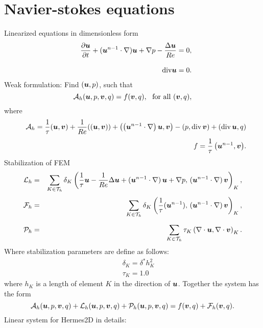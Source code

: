 \documentclass[a4paper,12pt]{article}
\newcommand{\bfu}{\mbox{\boldmath $u$}}
\newcommand{\bfv}{\mbox{\boldmath $v$}}
\begin{document}
\section{Navier-stokes equations}

Linearized equations in dimensionless form
\begin{eqnarray}
&& \displaystyle{\frac{\partial \bfu}{\partial t} + (\bfu^{n-1} \cdot \nabla)\bfu + \nabla p - \frac{\Delta \bfu}{Re} = 0,}\\[3mm]
&& \displaystyle{\mbox{div} \bfu = 0.}
\end{eqnarray}
Weak formulation: Find $(\bfu, p)$, such that
\begin{equation}
 {\cal A}_h(\bfu, p, \bfv, q) = f(\bfv, q),\ \ \mbox{for all} \ (\bfv, q),
\end{equation}
where
\begin{eqnarray*}
 && \displaystyle{{\cal A}_h = \frac{1}{\tau}(\bfu,\bfv) + \frac{1}{Re}
 ((\bfu,\bfv)) +
   \left(\left(\bfu^{n-1}\cdot\nabla
   \right)\bfu,\bfv\right)-(p,\mbox{div}\,\bfv)+(\mbox{div}\,\bfu,q)}
   \\[1mm]
 && \displaystyle{f = \frac{1}{\tau}\left({\bfu}^{n-1},\bfv\right)}.
  \label{weak3}
\end{eqnarray*}
Stabilization of FEM
\begin{eqnarray}
  {\cal L}_h &=& \sum_{K\in {\cal T}_{h}}\delta_K
    \left(\frac{1}{\tau}\bfu - \frac{1}{Re}\Delta\bfu +
    (\bfu^{n-1}\cdot\nabla)\,\bfu + \nabla p,\,
    (\bfu^{n-1}\cdot\nabla)\,\bfv\right)_{K}, \label{Lh}\\[1mm]
  {\cal F}_h&=&\sum_{K\in {\cal T}_{h}}\delta_K
    \left(\frac{1}{\tau}({\bfu}^{n-1}),\,
    (\bfu^{n-1}\cdot\nabla)\,\bfv\right)_{K}, \label{Fh}\\[2mm]
  {\cal P}_h &=& \sum_{K\in {\cal T}_{h}}\tau_K\left(\nabla\cdot \bfu,\nabla\cdot
  \bfv\right)_K.
\end{eqnarray}
Where stabilization parameters are define as follows:
\begin{eqnarray*}
 &&\delta_K = \delta^* {h^2_K}\\[3mm]
 &&\tau_K = 1.0
\end{eqnarray*}
where $h_K$ is a length of element $K$ in the direction of $\bfu$.
Together the system has the form
\begin{equation}
 {\cal A}_h(\bfu, p, \bfv, q) + {\cal L}_h(\bfu, p, \bfv, q) + {\cal P}_h(\bfu, p, \bfv, q)= f(\bfv, q) + {\cal F}_h(\bfv, q).
\end{equation}
Linear system for Hermes2D in details:
\end{document}
